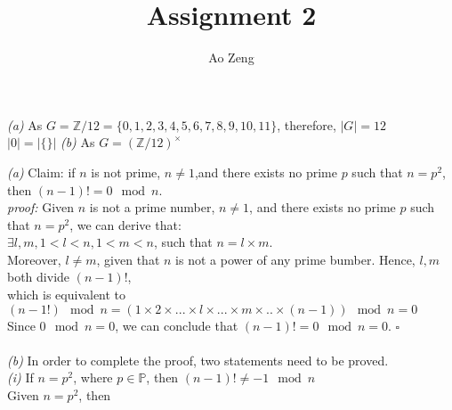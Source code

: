 \documentclass[11pt]{article}
\newcommand{\abs}[1]{\lvert #1 \rvert}
\newenvironment{problem}[2][Problem]{\begin{trivlist}
\item[\hskip \labelsep {\bfseries #1}\hskip \labelsep {\bfseries #2.}]}{\end{trivlist}}
\begin{document}
\title{Assignment 2}
\author{Ao Zeng}
\maketitle
\begin{problem}{1}
\textit{(a)} As $G = \mathbb{Z} / 12 = \{ 0,1,2,3,4,5,6,7,8,9,10,11 \}$, therefore, $\abs{G} = 12$\\
$\abs{0} = \abs{ \{ \}}$
\textit{(b)} As $G = (\mathbb{Z}/12)^{\times} $
\end{problem}

\begin{problem}{2}
\textit{(a)}  Claim: if $n$ is not prime, $n \neq 1$,and there exists no prime $p$ such that $n = p^2$, then $(n-1)! = 0 \mod n$.\\
\textit{proof:} Given $n$ is not a prime number, $n \neq 1$, and there exists no prime $p$ such that $n = p^2$, we can derive that:\\
 $\exists l,m, 1<l<n, 1<m<n$, such that $ n = l \times m$.\\
 Moreover, $l\neq m$, given that $n$ is not a power of any prime bumber.
Hence, $l, m$ both divide $(n-1)!$,\\
which is equivalent to $( n-1!) \mod n = (1\times 2 \times ... \times l \times ... \times m \times .. \times (n-1)) \mod n = 0$\\
Since $0 \mod n = 0$, we can conclude that $(n-1)! = 0 \mod n = 0$. $\square$\\
\\
\textit{(b)} In order to complete the proof, two statements need to be proved.\\
\textit{(i)} If $n = p^2$, where $p \in \mathbb{P}$, then $(n-1)!\neq -1 \mod n$\\
Given $n = p^2$, then 
\end{problem}
\end{document}
